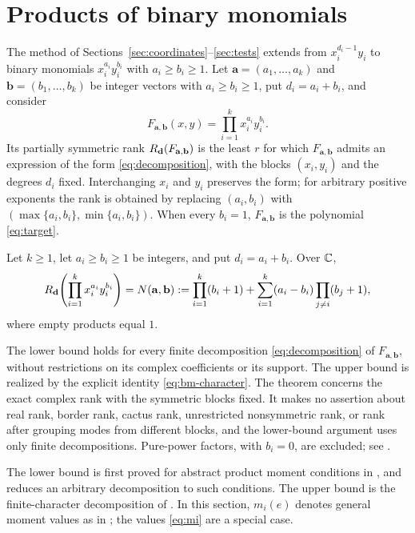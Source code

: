 \section{Products of binary monomials}\label{sec:binary}

The method of Sections~\ref{sec:coordinates}--\ref{sec:tests} extends
from $x_i^{d_i-1}y_i$ to binary monomials $x_i^{a_i}y_i^{b_i}$ with
$a_i\ge b_i\ge1$. Let $\mathbf a=(a_1,\ldots,a_k)$ and
$\mathbf b=(b_1,\ldots,b_k)$ be integer vectors with $a_i\ge b_i\ge1$,
put $d_i=a_i+b_i$, and consider
\begin{equation}\label{eq:bm-target}
F_{\mathbf a,\mathbf b}(x,y)=\prod_{i=1}^k x_i^{a_i}y_i^{b_i}.
\end{equation}
Its partially symmetric rank $R_{\mathbf d}(F_{\mathbf a,\mathbf b})$ is the
least $r$ for which $F_{\mathbf a,\mathbf b}$ admits an expression of
the form \eqref{eq:decomposition}, with the blocks $(x_i,y_i)$ and the
degrees $d_i$ fixed. Interchanging $x_i$ and $y_i$ preserves the form;
for arbitrary positive exponents the rank is obtained by replacing
$(a_i,b_i)$ with $(\max\{a_i,b_i\},\min\{a_i,b_i\})$. When every
$b_i=1$, $F_{\mathbf a,\mathbf b}$ is the polynomial \eqref{eq:target}.

\begin{theorem}\label{thm:binary}
Let $k\ge1$, let $a_i\ge b_i\ge1$ be integers, and put $d_i=a_i+b_i$.
Over $\mathbb C$,
\begin{equation}\label{eq:bm-rank}
R_{\mathbf d}\!\left(\prod_{i=1}^k x_i^{a_i}y_i^{b_i}\right)
=N(\mathbf a,\mathbf b)
:=\prod_{i=1}^k(b_i+1)+\sum_{i=1}^k(a_i-b_i)\prod_{j\ne i}(b_j+1),
\end{equation}
where empty products equal $1$.
\end{theorem}

The lower bound holds for every finite decomposition
\eqref{eq:decomposition} of $F_{\mathbf a,\mathbf b}$, without
restrictions on its complex coefficients or its support. The upper
bound is realized by the explicit identity \eqref{eq:bm-character}.
The theorem concerns the exact complex rank with the symmetric blocks
fixed. It makes no assertion about real rank, border rank, cactus rank,
unrestricted nonsymmetric rank, or rank after grouping modes from
different blocks, and the lower-bound argument uses only finite
decompositions. Pure-power factors, with $b_i=0$, are excluded; see
.

The lower bound is first proved for abstract product moment conditions
in , and  reduces an arbitrary
decomposition to such conditions. The upper bound is the
finite-character decomposition of . In this
section, $m_i(e)$ denotes general moment values as in ;
the values \eqref{eq:mi} are a special case.

